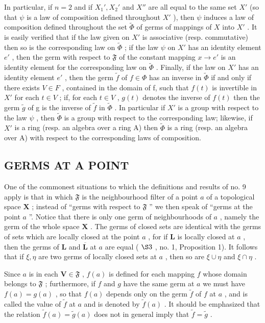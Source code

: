 In particular, if \(n = 2\) and if \(X_1', X_2'\) and \(X''\) are all equal to the same set \(X'\) (so that \(\psi\) is a law of composition defined throughout \(X'\) ), then \(\psi\) induces a law of composition defined throughout the set \(\tilde{\Phi}\) of germs of mappings of \(X\) into \(X'\) . It is easily verified that if the law given on \(X'\) is associative (resp. commutative) then so is the corresponding law on \(\tilde{\Phi}\) ; if the law \(\psi\) on \(X'\) has an identity element \(e'\) , then the germ with respect to \(\mathfrak{F}\) of the constant mapping \(x \to e'\) is an identity element for the corresponding law on \(\tilde{\Phi}\) . Finally, if the law on \(X'\) has an identity element \(e'\) , then the germ \(\tilde{f}\) of \(f \in \Phi\) has an inverse in \(\tilde{\Phi}\) if and only if there exists \(V \in F\) , contained in the domain of f, such that \(f(t)\) is invertible in \(X'\) for each \(t \in V\) ; if, for each \(t \in V\) , \(g(t)\) denotes the inverse of \(f(t)\) then the germ \(\tilde{g}\) of g is the inverse of \(\tilde{f}\) in \(\tilde{\Phi}\) . In particular if \(X'\) is a group with respect to the law \(\psi\) , then \(\tilde{\Phi}\) is a group with respect to the corresponding law; likewise, if \(X'\) is a ring (resp. an algebra over a ring A) then \(\tilde{\Phi}\) is a ring (resp. an algebra over A) with respect to the corresponding laws of composition.

\subsection{GERMS AT A POINT}

One of the commonest situations to which the definitions and results of no. 9 apply is that in which \(\mathfrak{F}\) is the neighbourhood filter of a point \(a\) of a topological space \(\mathbf{X}\) ; instead of ``germs with respect to \(\mathfrak{F}\) '' we then speak of ``germs at the point \(a\) ''. Notice that there is only one germ of neighbourhoods of \(a\) , namely the germ of the whole space \(\mathbf{X}\) . The germs of closed sets are identical with the germs of sets which are locally closed at the point \(a\) , for if \(\mathbf{L}\) is locally closed at \(a\) , then the germs of \(\mathbf{L}\) and \(\overline{\mathbf{L}}\) at \(a\) are equal ( \(\S 3\) , no. 1, Proposition 1). It follows that if \(\xi, \eta\) are two germs of locally closed sets at \(a\) , then so are \(\xi \cup \eta\) and \(\xi \cap \eta\) .

Since \(a\) is in each \(\mathbf{V} \in \mathfrak{F}\) , \(f(a)\) is defined for each mapping \(f\) whose domain belongs to \(\mathfrak{F}\) ; furthermore, if \(f\) and \(g\) have the same germ at \(a\) we must have \(f(a) = g(a)\) , so that \(f(a)\) depends only on the germ \(\tilde{f}\) of \(f\) at \(a\) , and is called the value of \(\tilde{f}\) at \(a\) and is denoted by \(\tilde{f}(a)\) . It should be emphasized that the relation \(\tilde{f}(a) = \tilde{g}(a)\) does not in general imply that \(\tilde{f} = \tilde{g}\) .

